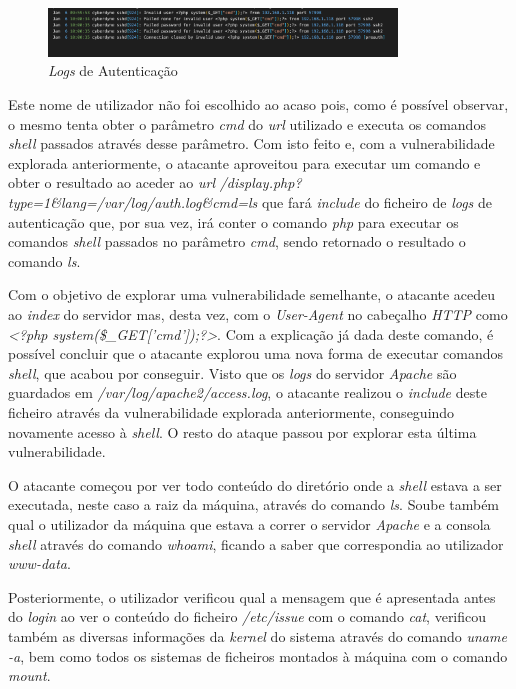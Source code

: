 \documentclass[10pt,english]{article}
\begin{document}
\clearpage

\begin{figure}[h]
    \centering
    \includegraphics[width=350]{images/auth.png}
    \caption{\textit{Logs} de Autenticação}
\end{figure}

\par Este nome de utilizador não foi escolhido ao acaso pois, como é possível observar, o mesmo tenta obter o parâmetro \textit{cmd} do \textit{url} utilizado e executa os comandos \textit{shell} passados através desse parâmetro. Com isto feito e, com a vulnerabilidade explorada anteriormente, o atacante aproveitou para executar um comando e obter o resultado ao aceder ao \textit{url} \textit{/display.php?type=1&lang=/var/log/auth.log&cmd=ls} que fará \textit{include} do ficheiro de \textit{logs} de autenticação que, por sua vez, irá conter o comando \textit{php} para executar os comandos \textit{shell} passados no parâmetro \textit{cmd}, sendo retornado o resultado o comando \textit{ls}.

\par Com o objetivo de explorar uma vulnerabilidade semelhante, o atacante acedeu ao \textit{index} do servidor mas, desta vez, com o \textit{User-Agent} no cabeçalho \textit{HTTP} como \textit{<?php system(\$\_GET['cmd']);?>}. Com a explicação já dada deste comando, é possível concluir que o atacante explorou uma nova forma de executar comandos \textit{shell}, que acabou por conseguir. Visto que os \textit{logs} do servidor \textit{Apache} são guardados em \textit{/var/log/apache2/access.log}, o atacante realizou o \textit{include} deste ficheiro através da vulnerabilidade explorada anteriormente, conseguindo novamente acesso à \textit{shell}. O resto do ataque passou por explorar esta última vulnerabilidade.

\par O atacante começou por ver todo conteúdo do diretório onde a \textit{shell} estava a ser executada, neste caso a raiz da máquina, através do comando \textit{ls}. Soube também qual o utilizador da máquina que estava a correr o servidor \textit{Apache} e a consola \textit{shell} através do comando \textit{whoami}, ficando a saber que correspondia ao utilizador \textit{www-data}.

\par Posteriormente, o utilizador verificou qual a mensagem que é apresentada antes do \textit{login} ao ver o conteúdo do ficheiro \textit{/etc/issue} com o comando \textit{cat}, verificou também as diversas informações da \textit{kernel} do sistema através do comando \textit{uname -a}, bem como todos os sistemas de ficheiros montados à máquina com o comando \textit{mount}.
\end{document}
